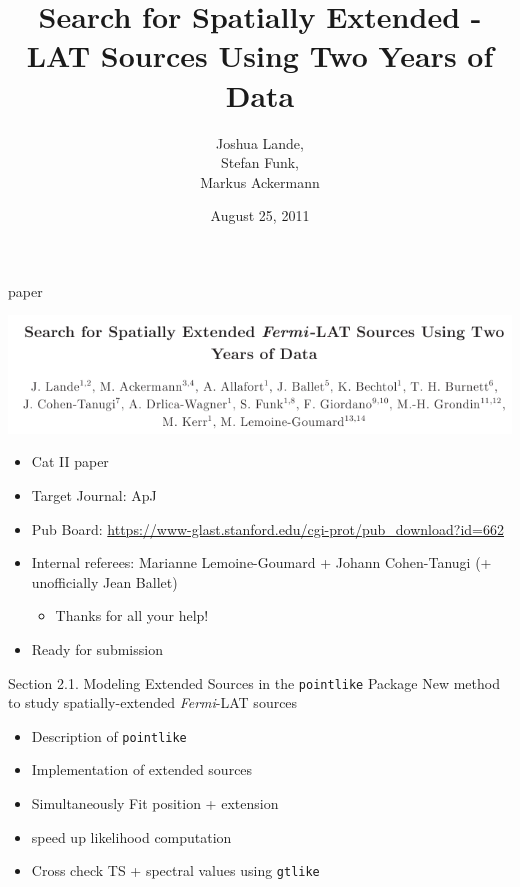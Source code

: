 \documentclass[12pt]{beamer}
\title{Search for Spatially Extended \fermi-LAT Sources Using Two Years of Data}
\author{Joshua Lande,\\
Stefan Funk,\\
Markus Ackermann}
\date{August 25, 2011}
\begin{document}
\fermititle

\begin{frame}{paper}

  \includegraphics[scale=0.45]{plots/title.png}

  \begin{itemize}
    \item Cat II paper
    \item Target Journal: ApJ
    \item Pub Board: \url{https://www-glast.stanford.edu/cgi-prot/pub_download?id=662}
    \item Internal referees: Marianne Lemoine-Goumard + Johann Cohen-Tanugi (+ unofficially Jean Ballet)
      \begin{itemize}
        \item Thanks for all your help!
      \end{itemize}
    \item Ready for submission
  \end{itemize}
\end{frame}

\begin{frame}{Section 2.1. Modeling Extended Sources in the \texttt{pointlike} Package}
  New method to study spatially-extended {\em Fermi}-LAT sources
  \begin{itemize}
    \item Description of \texttt{pointlike}
    \item Implementation of extended sources
    \item Simultaneously Fit position + extension
    \item speed up likelihood computation
    \item Cross check TS + spectral values using \texttt{gtlike}
  \end{itemize}
\end{frame}
\end{document}
